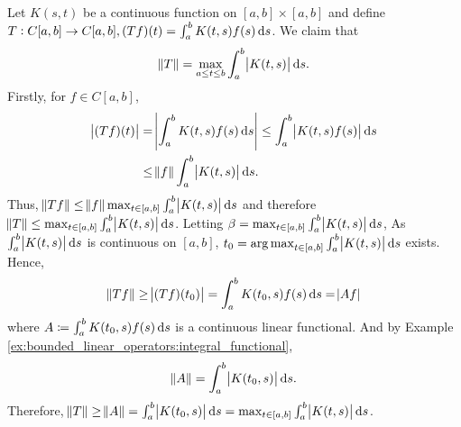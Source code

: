 \begin{example}
\label{ex:bounded_linear_operators:integral_kernel}
Let $K(s, t)$ be a continuous function on $[a, b] \times [a, b]$ and define 
$T: C[a, b] \to C[a, b], (Tf)(t) = \int_{a}^{b} K(t, s) f(s) \mathop{}\!\mathrm{d} s$. 
We claim that 
\begin{equation*}
    \norm{T} = \max_{a \le t \le b} \int_{a}^{b} \abs{K(t, s)} \mathop{}\!\mathrm{d} s. 
\end{equation*}
Firstly, for $f \in C[a, b]$, 
\begin{equation*}
    \begin{aligned}
        \abs{(Tf)(t)} &= \abs{\int_{a}^{b} K(t, s) f(s) \mathop{}\!\mathrm{d} s} 
        \le \int_{a}^{b} \abs{K(t, s) f(s)} \mathop{}\!\mathrm{d} s \\
        &\le \norm{f} \int_{a}^{b} \abs{K(t, s)} \mathop{}\!\mathrm{d} s.
    \end{aligned}
\end{equation*}
Thus, $\norm{Tf} \le \norm{f} \max_{t \in [a, b]} \int_{a}^{b} 
\abs{K(t, s)} \mathop{}\!\mathrm{d} s$ and therefore $\norm{T} \le \max_{t \in [a, b]} 
\int_{a}^{b} \abs{K(t, s)} \mathop{}\!\mathrm{d} s$. 
Letting $\beta = \max_{t \in [a, b]} \int_{a}^{b} \abs{K(t, s)} \mathop{}\!\mathrm{d} s$, 
As $\int_{a}^{b} \abs{K(t, s)} \mathop{}\!\mathrm{d} s$ is continuous on $[a, b]$, 
$t_0 = \operatorname*{arg\,max}_{t \in [a, b]} \int_{a}^{b} \abs{K(t, s)} \mathop{}\!\mathrm{d} s$ exists. 
Hence, 
\begin{equation*}
    \norm{Tf} \ge \abs{(Tf)(t_0)} = \int_{a}^{b} K(t_0, s) f(s) \mathop{}\!\mathrm{d} s 
    = \abs{Af}
\end{equation*}
where $A \coloneqq \int_{a}^{b} K(t_0, s) f(s) \mathop{}\!\mathrm{d} s$ is a continuous 
linear functional. 
And by Example \ref{ex:bounded_linear_operators:integral_functional}, 
\begin{equation*}
    \norm{A} = \int_{a}^{b} \abs{K(t_0, s)} \mathop{}\!\mathrm{d} s.
\end{equation*}
Therefore, $\norm{T} \ge \norm{A} = \int_{a}^{b} \abs{K(t_0, s)} \mathop{}\!\mathrm{d} s = 
\max_{t \in [a, b]} \int_{a}^{b} \abs{K(t, s)} \mathop{}\!\mathrm{d} s$. 
\end{example}

